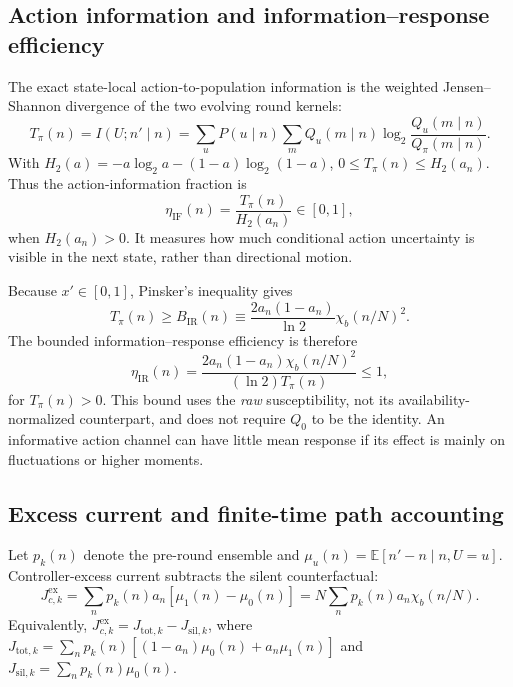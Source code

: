 \subsection{Action information and information--response efficiency}

The exact state-local action-to-population information is the weighted
Jensen--Shannon divergence of the two evolving round kernels:
\begin{equation}
T_\pi(n)=I(U;n'\mid n)
=\sum_u P(u\mid n)\sum_m Q_u(m\mid n)
\log_2\frac{Q_u(m\mid n)}{Q_\pi(m\mid n)}.
\label{eq:action-population-information}
\end{equation}
With $H_2(a)=-a\log_2a-(1-a)\log_2(1-a)$,
$0\le T_\pi(n)\le H_2(a_n)$. Thus the action-information fraction is
\begin{equation}
\eta_{\mathrm{IF}}(n)=\frac{T_\pi(n)}{H_2(a_n)}\in[0,1],
\label{eq:blackboard_eta_if}
\end{equation}
when $H_2(a_n)>0$. It measures how much conditional action uncertainty is
visible in the next state, rather than directional motion.

Because $x'\in[0,1]$, Pinsker's inequality gives
\begin{equation}
T_\pi(n)\ge B_{\mathrm{IR}}(n)
\equiv\frac{2a_n(1-a_n)}{\ln2}\chi_b(n/N)^2.
\label{eq:information-response-bound}
\end{equation}
The bounded information--response efficiency is therefore
\begin{equation}
\boxed{\eta_{\mathrm{IR}}(n)
=\frac{2a_n(1-a_n)\chi_b(n/N)^2}{(\ln2)T_\pi(n)}\le1,}
\label{eq:eta_ir}
\end{equation}
for $T_\pi(n)>0$. This bound uses the \emph{raw} susceptibility, not its
availability-normalized counterpart, and does not require $Q_0$ to be the
identity. An informative action channel can have little mean response if
its effect is mainly on fluctuations or higher moments.

\subsection{Excess current and finite-time path accounting}
\label{sec:thermodynamic_efficiency}

Let $p_k(n)$ denote the pre-round ensemble and
$\mu_u(n)=\mathbb{E}[n'-n\mid n,U=u]$. Controller-excess current subtracts the
silent counterfactual:
\begin{equation}
\boxed{J_{c,k}^{\mathrm{ex}}
=\sum_n p_k(n)a_n[\mu_1(n)-\mu_0(n)]
=N\sum_n p_k(n)a_n\chi_b(n/N).}
\label{eq:mean_controlled_current_single_affinity}
\end{equation}
Equivalently, $J_{c,k}^{\mathrm{ex}}=J_{\mathrm{tot},k}-J_{\mathrm{sil},k}$,
where $J_{\mathrm{tot},k}=\sum_np_k(n)[(1-a_n)\mu_0(n)+a_n\mu_1(n)]$
and $J_{\mathrm{sil},k}=\sum_np_k(n)\mu_0(n)$.

